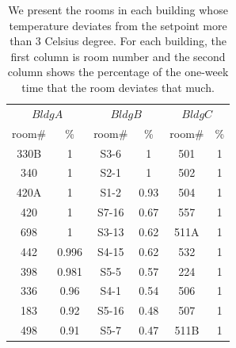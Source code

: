 \begin{table}[h!]
 \begin{center}
	\begin{tabular}{|c|c|c|c|c|c|}
	\multicolumn{2}{c}{$Bldg A$}
	 & \multicolumn{2}{c}{$Bldg B$}
	  & \multicolumn{2}{c}{$Bldg C$} \\
	\cline{1-6} 
	 room\# & \% & room\# & \% & room\# & \%\\
	\cline{1-6}
	 330B & 1 & S3-6 & 1 & 501 & 1\\
	\cline{1-6}
	 340 & 1 & S2-1 & 1 & 502 & 1\\
	\cline{1-6}
	420A & 1 & S1-2 & 0.93 & 504 & 1\\
	\cline{1-6}
	420 & 1 & S7-16 & 0.67 & 557 & 1\\
	\cline{1-6}
	698 & 1 & S3-13 & 0.62 & 511A & 1\\
	\cline{1-6}
	442 & 0.996 & S4-15 & 0.62 & 532 & 1\\
	\cline{1-6}
	398 & 0.981 & S5-5 & 0.57 & 224 & 1\\
	\cline{1-6}
	336 & 0.96 & S4-1 & 0.54 & 506 & 1\\
	\cline{1-6}
	183 & 0.92 & S5-16 & 0.48 & 507 & 1\\
	\cline{1-6}
	498 & 0.91 & S5-7 & 0.47 & 511B & 1\\
	\cline{1-6}

	\end{tabular}
 \end{center}
 \caption{We present the rooms in each building whose temperature deviates from the setpoint more than 3 Celsius degree. For each building, the first column is room number and the second column shows the percentage of the one-week time that the room deviates that much.}
 \label{tab:cluster}
\end{table}
